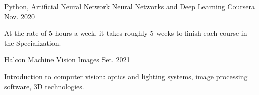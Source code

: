 

\begin{cventries}

  \cventry
    {Python, Artificial Neural Network} %
    {Neural Networks and Deep Learning} %
    {Coursera} %
    {Nov. 2020} %
    {
      \begin{cvitems} %
        \item {At the rate of 5 hours a week, it takes roughly 5 weeks to finish each course in the Specialization.}
      \end{cvitems}
    }

  \cventry
    {Halcon} %
    {Machine Vision} %
    {Images} %
    {Set. 2021} %
    {
      \begin{cvitems} %
        \item {Introduction to computer vision: optics and lighting systems, image processing software, 3D technologies.}
      \end{cvitems}
    }

\end{cventries}
